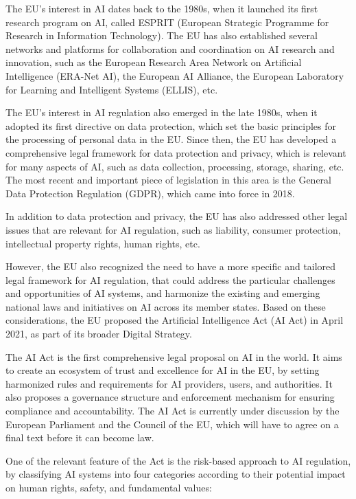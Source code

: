 \documentclass{article}
\begin{document}
	The EU’s interest in AI dates back to the 1980s, when it launched its first research program on AI, called ESPRIT (European Strategic Programme for Research in Information Technology). 
	The EU has also established several networks and platforms for collaboration and coordination on AI research and innovation, such as the European Research Area Network on Artificial Intelligence (ERA-Net AI), the European AI Alliance, the European Laboratory for Learning and Intelligent Systems (ELLIS), etc.
	
	The EU’s interest in AI regulation also emerged in the late 1980s, when it adopted its first directive on data protection, which set the basic principles for the processing of personal data in the EU. 
	Since then, the EU has developed a comprehensive legal framework for data protection and privacy, which is relevant for many aspects of AI, such as data collection, processing, storage, sharing, etc.
	The most recent and important piece of legislation in this area is the General Data Protection Regulation (GDPR), which came into force in 2018. 
	
	In addition to data protection and privacy, the EU has also addressed other legal issues that are relevant for AI regulation, such as liability, consumer protection, intellectual property rights, human rights, etc.
	
	However, the EU also recognized the need to have a more specific and tailored legal framework for AI regulation, that could address the particular challenges and opportunities of AI systems, and harmonize the existing and emerging national laws and initiatives on AI across its member states. 
	Based on these considerations, the EU proposed the Artificial Intelligence Act (AI Act) in April 2021, as part of its broader Digital Strategy. 
	
	The AI Act is the first comprehensive legal proposal on AI in the world.
	It aims to create an ecosystem of trust and excellence for AI in the EU, by setting harmonized rules and requirements for AI providers, users, and authorities. 
	It also proposes a governance structure and enforcement mechanism for ensuring compliance and accountability. 
	The AI Act is currently under discussion by the European Parliament and the Council of the EU, which will have to agree on a final text before it can become law.
	
	One of the relevant feature of the Act is the risk-based approach to AI regulation, by classifying AI systems into four categories according to their potential impact on human rights, safety, and fundamental values:
	
\end{document}
